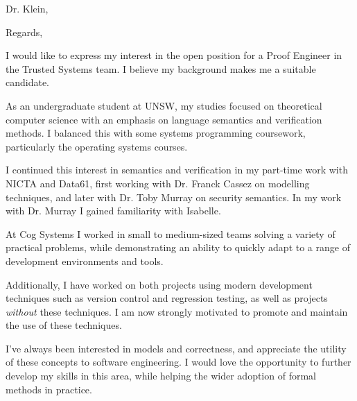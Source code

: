 \documentclass[11pt,a4paper]{moderncv}        %
\begin{document}
\date{\today}
\opening{Dr. Klein,}
\closing{Regards,}
\makelettertitle

I would like to express my interest in the open position for a Proof Engineer in the Trusted Systems team. I believe my background makes me a suitable candidate.

As an undergraduate student at UNSW, my studies focused on theoretical computer science with an emphasis on language semantics and verification methods. I balanced this with some systems programming coursework, particularly the operating systems courses.

I continued this interest in semantics and verification in my part-time work with NICTA and Data61, first working with Dr. Franck Cassez on modelling techniques, and later with Dr. Toby Murray on security semantics. In my work with Dr. Murray I gained familiarity with Isabelle.

At Cog Systems I worked in small to medium-sized teams solving a variety of practical problems, while demonstrating an ability to quickly adapt to a range of development environments and tools.

Additionally, I have worked on both projects using modern development techniques such as version control and regression testing, as well as projects \textit{without} these techniques. I am now strongly motivated to promote and maintain the use of these techniques.

I've always been interested in models and correctness, and appreciate the utility of these concepts to software engineering. I would love the opportunity to further develop my skills in this area, while helping the wider adoption of formal methods in practice.

\makeletterclosing
\end{document}
